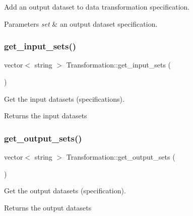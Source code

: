 Add an output dataset to data transformation specification. 
\begin{DoxyParams}{Parameters}
{\em set} & an output dataset specification. \\
\hline
\end{DoxyParams}
\mbox{\label{classTransformation_a96a5923535ff3663c478fdc0cd7ddc34}} 
\subsubsection{\texorpdfstring{get\+\_\+input\+\_\+sets()}{get\_input\_sets()}}
{\footnotesize\ttfamily vector$<$ string $>$ Transformation\+::get\+\_\+input\+\_\+sets (\begin{DoxyParamCaption}{ }\end{DoxyParamCaption})}

Get the input datasets (specifications). \begin{DoxyReturn}{Returns}
the input datasets 
\end{DoxyReturn}
\mbox{\label{classTransformation_a309852a4fbb5db261a1a6d564c7147c8}} 
\subsubsection{\texorpdfstring{get\+\_\+output\+\_\+sets()}{get\_output\_sets()}}
{\footnotesize\ttfamily vector$<$ string $>$ Transformation\+::get\+\_\+output\+\_\+sets (\begin{DoxyParamCaption}{ }\end{DoxyParamCaption})}

Get the output datasets (specification). \begin{DoxyReturn}{Returns}
the output datasets 
\end{DoxyReturn}
\mbox{\label{classTransformation_adfe87345cdc0ebff5a6212dd9779ec87}} 
